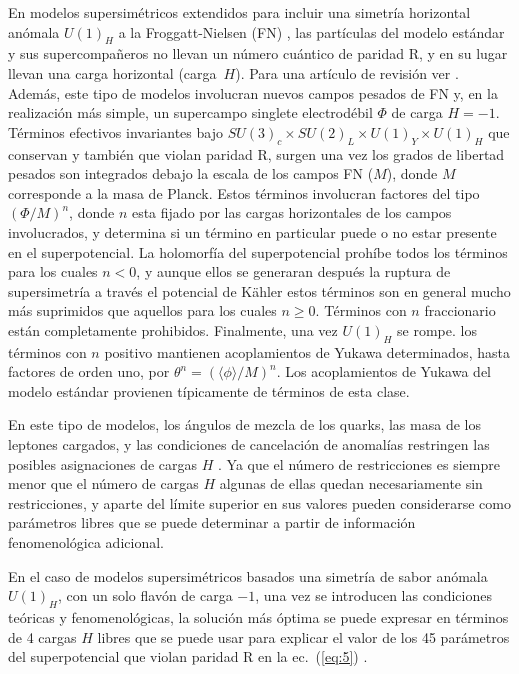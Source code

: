 En modelos supersimétricos extendidos para incluir una simetría
horizontal anómala $U(1)_H$ a la Froggatt-Nielsen (FN)
\cite{Froggatt:1978nt}, las partículas del modelo estándar y sus
supercompañeros no llevan un número cuántico de paridad R, y en su
lugar llevan una carga horizontal (carga~$H$). Para una artículo de
revisión ver \cite{Dreiner:2003hw}.  Además, este tipo de modelos
involucran nuevos campos pesados de FN y, en la realización más
simple, un supercampo singlete electrodébil $\Phi$ de carga
$H=-1$. Términos efectivos invariantes bajo $SU(3)_c\times
SU(2)_L\times U(1)_Y\times U(1)_H$ que conservan y también que violan
paridad R, surgen una vez los grados de libertad pesados son
integrados debajo la escala de los campos FN ($M$), donde $M$
corresponde a la masa de Planck. Estos términos involucran factores
del tipo $(\Phi/M)^n$, donde $n$ esta fijado por las cargas
horizontales de los campos involucrados, y determina si un término en
particular puede o no estar presente en el superpotencial. La
holomorfía del superpotencial prohíbe todos los términos para los
cuales $n<0$, y aunque ellos se generaran después la ruptura de
supersimetría a través el potencial de Kähler \cite{Giudice:1988yz}
estos términos son en general mucho más suprimidos que aquellos para
los cuales $n\ge0$.  Términos con $n$ fraccionario están completamente
prohibidos. Finalmente, una vez $U(1)_H$ se rompe. los términos con $n$
positivo mantienen acoplamientos de Yukawa determinados, hasta
factores de orden uno, por $\theta^n=(\langle\phi\rangle/M)^n$. Los
acoplamientos de Yukawa del modelo estándar provienen típicamente de
términos de esta clase.

En este tipo de modelos, los ángulos de mezcla de los quarks, las masa
de los leptones cargados, y las condiciones de cancelación de
anomalías restringen las posibles asignaciones de cargas $H$
\cite{Leurer:1992wg,Binetruy:1996xk}. Ya que el número de
restricciones es siempre menor que el número de cargas $H$ algunas de
ellas quedan necesariamente sin restricciones, y aparte del límite
superior en sus valores pueden considerarse como parámetros libres que
se puede determinar a partir de información fenomenológica
adicional. 


En el caso de modelos supersimétricos basados una simetría de sabor
anómala $U(1)_H$, con un solo flavón de carga $-1$, una vez se
introducen las condiciones teóricas y fenomenológicas, la solución más
óptima se puede expresar en términos de 4 cargas $H$ libres que se
puede usar para explicar el valor de los 45 parámetros del
superpotencial que violan paridad R en la ec.~(\ref{eq:5})
\cite{Mira:2000gg,Dreiner:2003hw,Dreiner:2003yr,Dreiner:2007vp,Dreiner:2006xw,Sierra:2009zq}.

